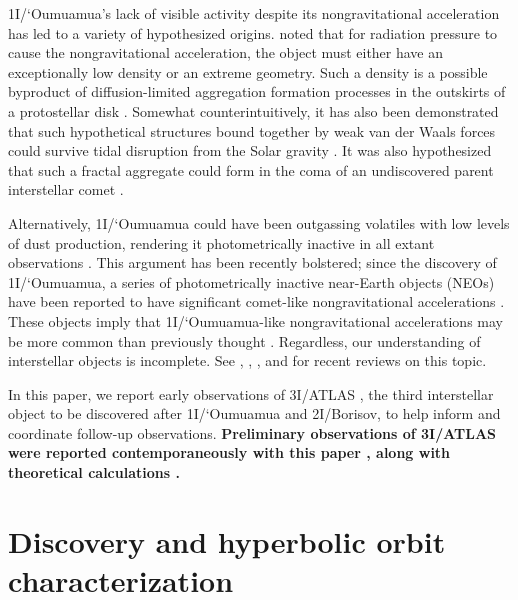 \documentclass[linenumbers,twocolumn,longbib]{aastex7}
\begin{document}
1I/`Oumuamua's lack of visible activity despite its nongravitational acceleration has led to a variety of hypothesized origins. \citet{Micheli2018} noted that for radiation pressure to cause the nongravitational acceleration, the object must either have an exceptionally low density or an extreme geometry. Such a density is a possible byproduct of diffusion-limited aggregation formation processes in the outskirts of a protostellar disk \citep{MoroMartin2019}. Somewhat counterintuitively, it has also been demonstrated that such hypothetical structures bound together by weak van der Waals forces could survive tidal disruption from the Solar gravity \citep{Flekkoy19}. It was also hypothesized that such a fractal aggregate could form in the coma of an undiscovered parent interstellar comet \citep{Luu20}.

Alternatively, 1I/`Oumuamua could have been outgassing volatiles with low levels of dust production, rendering it photometrically inactive in all extant observations \citep{Micheli2018,Sekanina2019,Seligman2020,Levine2021,Levine2021_h2,desch20211i,jackson20211i,Desch2022,Bergner2023}. This argument has been recently bolstered; since the discovery of 1I/`Oumuamua, a series of photometrically inactive near-Earth objects (NEOs) have been reported to have significant comet-like nongravitational accelerations \citep{Farnocchia2023,Seligman2023b,Seligman2024PNAS}. These objects imply that 1I/`Oumuamua-like nongravitational accelerations may be more common than previously thought \citep{Taylor2024}. Regardless, our understanding of interstellar objects is incomplete. See \citet{Fitzsimmons2024}, \citet{Seligman2023}, \citet{Jewitt2023ARAA}, and \citet{MoroMartin2022} for recent reviews on this topic.

In this paper, we report early observations of 3I/ATLAS \textbf{\citep{Denneau2025}}, the third interstellar object to be discovered after 1I/`Oumuamua and 2I/Borisov,  to help inform and coordinate follow-up observations. \textbf{Preliminary observations of 3I/ATLAS were reported contemporaneously with this paper \citep{Jewitt2025,Alarcon2025,Bolin2025,Opitom2025,Belyakov2025, Kareta2025, Marcos2025,Yang2025}, along with theoretical calculations \citep{Taylor2025,loeb2025,Hopkins2025b,Hibberd2025,Yaginuma2025}. }

\section{Discovery and hyperbolic orbit characterization}\label{sec:orbit}
\end{document}
